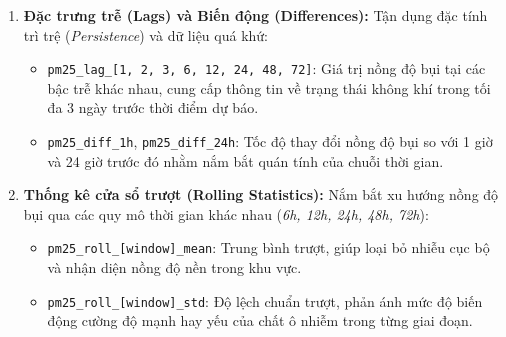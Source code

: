 \begin{enumerate}
\begin{itemize}
        \item \texttt{is\_raining}: Chỉ báo trạng thái có mưa dựa trên dữ liệu khí tượng.
        \item \texttt{hours\_since\_last\_rain}: Tính toán thời gian tích lũy kể từ lần mưa gần nhất để mô tả sự phục hồi nồng độ bụi sau khi bị rửa trôi bởi hiện tượng lắng đọng ướt.
        \item \texttt{wind\_u}, \texttt{wind\_v}: Thành phần vector hóa của gió (tốc độ và hướng) trên trục tọa độ, giúp mô tả chính xác hướng vận chuyển khối khí thay vì sử dụng độ đơn thuần.
        \item \texttt{wind\_condition}: Biến định tính phân loại các mức độ tĩnh lặng hoặc lưu động của không khí.
        \item \texttt{pressure\_trend\_3h}: Biến thiên áp suất trong 3 giờ gần nhất nhằm theo dõi sự ổn định hoặc xáo trộn của các hệ thống khí tượng bề mặt.
    \end{itemize}
    \item \textbf{Đặc trưng trễ (Lags) và Biến động (Differences):} Tận dụng đặc tính trì trệ (\textit{Persistence}) và dữ liệu quá khứ:
    \begin{itemize}
        \item \texttt{pm25\_lag\_[1, 2, 3, 6, 12, 24, 48, 72]}: Giá trị nồng độ bụi tại các bậc trễ khác nhau, cung cấp thông tin về trạng thái không khí trong tối đa 3 ngày trước thời điểm dự báo.
        \item \texttt{pm25\_diff\_1h}, \texttt{pm25\_diff\_24h}: Tốc độ thay đổi nồng độ bụi so với 1 giờ và 24 giờ trước đó nhằm nắm bắt quán tính của chuỗi thời gian.
    \end{itemize}
    \item \textbf{Thống kê cửa sổ trượt (Rolling Statistics):} Nắm bắt xu hướng nồng độ bụi qua các quy mô thời gian khác nhau (\textit{6h, 12h, 24h, 48h, 72h}):
    \begin{itemize}
        \item \texttt{pm25\_roll\_[window]\_mean}: Trung bình trượt, giúp loại bỏ nhiễu cục bộ và nhận diện nồng độ nền trong khu vực.
        \item \texttt{pm25\_roll\_[window]\_std}: Độ lệch chuẩn trượt, phản ánh mức độ biến động cường độ mạnh hay yếu của chất ô nhiễm trong từng giai đoạn.
    \end{itemize}
\end{enumerate}

